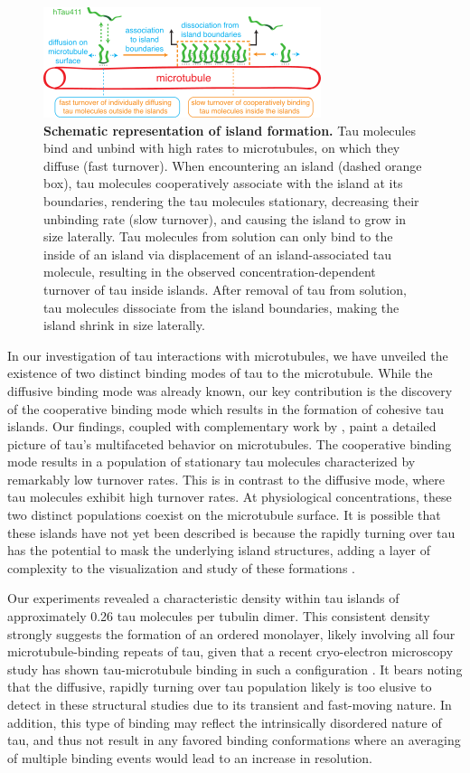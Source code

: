 \begin{figure}[h!tb]
\centering
\includegraphics[scale=1]{Figures/tau8.png}
\caption[Schematic representation of island formation.]{
\textbf{Schematic representation of island formation.} Tau molecules bind and unbind with high rates to microtubules, on which they diffuse (fast turnover). When encountering an island (dashed orange box), tau molecules cooperatively associate with the island at its boundaries, rendering the tau molecules stationary, decreasing their unbinding rate (slow turnover), and causing the island to grow in size laterally. Tau molecules from solution can only bind to the inside of an island via displacement of an island-associated tau molecule, resulting in the observed concentration-dependent turnover of tau inside islands. After removal of tau from solution, tau molecules dissociate from the island boundaries, making the island shrink in size laterally.
	}\label{tau8}
\end{figure}
In our investigation of tau interactions with microtubules, we have unveiled the existence of two distinct binding modes of tau to the microtubule. While the diffusive binding mode was already known, our key contribution is the discovery of the cooperative binding mode which results in the formation of cohesive tau islands. Our findings, coupled with complementary work by \cite{tan2019microtubules}, paint a detailed picture of tau's multifaceted behavior on microtubules.
The cooperative binding mode results in a population of stationary tau molecules characterized by remarkably low turnover rates. This is in contrast to the diffusive mode, where tau molecules exhibit high turnover rates. At physiological concentrations, these two distinct populations coexist on the microtubule surface. It is possible that these islands have not yet been described is because the rapidly turning over tau has the potential to mask the underlying island structures, adding a layer of complexity to the visualization and study of these formations . \par
Our experiments revealed a characteristic density within tau islands of approximately 0.26 tau molecules per tubulin dimer. This consistent density strongly suggests the formation of an ordered monolayer, likely involving all four microtubule-binding repeats of tau, given that a recent cryo-electron microscopy study has shown tau-microtubule binding in such a configuration \parencite{Kellogg2018}. It bears noting that the diffusive, rapidly turning over tau population likely is too elusive to detect in these structural studies due to its transient and fast-moving nature. In addition, this type of binding may reflect the intrinsically disordered nature of tau, and thus not result in any favored binding conformations where an averaging of multiple binding events would lead to an increase in resolution.\par 
